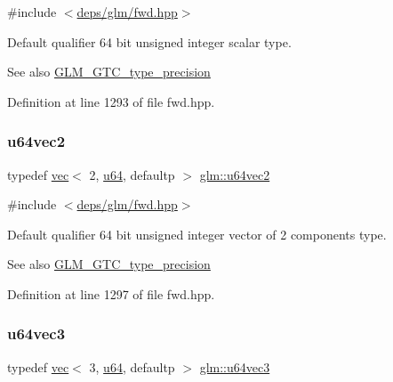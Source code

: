 {\ttfamily \#include $<$\hyperlink{fwd_8hpp}{deps/glm/fwd.\+hpp}$>$}

Default qualifier 64 bit unsigned integer scalar type. \begin{DoxySeeAlso}{See also}
\hyperlink{group__gtc__type__precision}{G\+L\+M\+\_\+\+G\+T\+C\+\_\+type\+\_\+precision} 
\end{DoxySeeAlso}


Definition at line 1293 of file fwd.\+hpp.

\mbox{\label{group__gtc__type__precision_ga989179a9ae798526e8bac59fb21678b7}} 
\subsubsection{\texorpdfstring{u64vec2}{u64vec2}}
{\footnotesize\ttfamily typedef \hyperlink{structglm_1_1vec}{vec}$<$ 2, \hyperlink{group__gtc__type__precision_ga71cedd4972f9cb1a5e14dfe5ab83ecd7}{u64}, defaultp $>$ \hyperlink{group__gtc__type__precision_ga989179a9ae798526e8bac59fb21678b7}{glm\+::u64vec2}}



{\ttfamily \#include $<$\hyperlink{fwd_8hpp}{deps/glm/fwd.\+hpp}$>$}

Default qualifier 64 bit unsigned integer vector of 2 components type. \begin{DoxySeeAlso}{See also}
\hyperlink{group__gtc__type__precision}{G\+L\+M\+\_\+\+G\+T\+C\+\_\+type\+\_\+precision} 
\end{DoxySeeAlso}


Definition at line 1297 of file fwd.\+hpp.

\mbox{\label{group__gtc__type__precision_ga2d3e22f2413f79536d5cf3561949cd53}} 
\subsubsection{\texorpdfstring{u64vec3}{u64vec3}}
{\footnotesize\ttfamily typedef \hyperlink{structglm_1_1vec}{vec}$<$ 3, \hyperlink{group__gtc__type__precision_ga71cedd4972f9cb1a5e14dfe5ab83ecd7}{u64}, defaultp $>$ \hyperlink{group__gtc__type__precision_ga2d3e22f2413f79536d5cf3561949cd53}{glm\+::u64vec3}}



